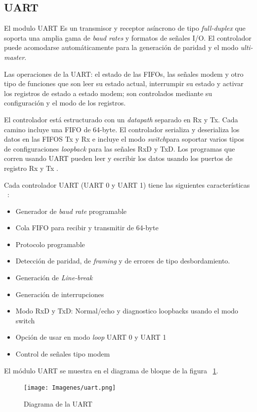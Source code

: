 \documentclass[a4paper,openright,12pt]{report}
\begin{document}
\subsection{UART}

El modulo UART Es un transmisor y receptor asíncrono de tipo \textit{full-duplex} que soporta una amplia gama de \textit{baud rates} y formatos de señales I/O. El controlador puede acomodarse automáticamente para la generación de paridad y el modo \textit{ulti-master}.

Las operaciones de la UART:  el estado de las FIFOs, las señales modem y otro tipo de funciones que son leer su estado actual, interrumpir su estado y activar los registros de estado a estado modem; son controlados mediante su configuración y el modo de los registros.

El controlador está estructurado con un \textit{datapath} separado en Rx y Tx. Cada camino incluye una FIFO de 64-byte. El controlador serializa y deserializa los datos en  las FIFOS Tx y Rx e incluye el modo \textit{switch}para soportar varios tipos de configuraciones \textit{loopback} para las señales RxD y TxD. Los programas que corren usando UART pueden leer y escribir los datos usando los puertos de registro Rx y Tx .  

Cada controlador UART  (UART 0 y  UART 1) tiene las siguientes características ~\cite{UART}:

\begin{itemize}
\item Generador de \textit{baud rate} programable
\item Cola FIFO para recibir y transmitir de 64-byte	
\item Protocolo programable
\item Detección de paridad, de \textit{framing} y de errores de tipo desbordamiento.
\item Generación de \textit{Line-break}
\item Generación de interrupciones
\item Modo RxD y TxD: Normal/echo y diagnostico loopbacks usando el modo switch
\item Opción de usar en modo \textit{loop} UART 0 y UART 1
\item Control de señales  tipo modem
\end{itemize}

El módulo UART se muestra en el diagrama de bloque de la figura ~\ref{UART}.
\begin{figure}[H]
	\centering
	\texttt{[image: Imagenes/uart.png]}
	\caption{Diagrama de la UART}
	\label{UART}
\end{figure}
\end{document}
